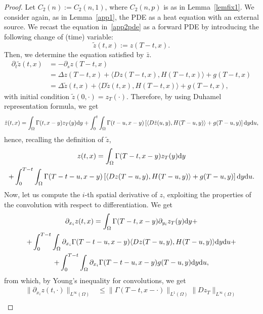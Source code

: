 \documentclass[10pt,a4paper,nouppercase,nowrite]{article}
\numberwithin{equation}{section}
\newcommand{\di}{{\rm d}}
\theoremstyle{definition}
\begin{document}
	\begin{proof}
		Let $C_2(n):=C_2(n,1)$, where $C_2(n,p)$ is as in Lemma~\ref{lemfix1}. We consider again, as in Lemma~\ref{app1}, the PDE as a heat equation with an external source. We recast the equation in~\eqref{app2pde} as a forward PDE by introducing the following change of (time) variable:
		$$\tilde z(t,x):=z(T-t,x).$$
		Then, we determine the equation satisfied by $\bar{z}$. 
		\begin{equation*}
			\begin{aligned}
				\partial_t \tilde z(t,x) &= -\partial_s z(T-t,x) \\
				&= \Delta z(T-t,x) + \langle Dz(T-t,x),H(T-t,x) \rangle + g(T-t,x) \\
				&=\Delta \tilde z (t,x) + \langle D\tilde z(t,x),H(T-t,x) \rangle + g(T-t,x),
			\end{aligned}
		\end{equation*}
		with initial condition $\tilde z(0,\cdot)=z_T(\cdot)$. Therefore, by using Duhamel representation formula, we get
		\begin{equation*}
			\tilde z(t,x)=\int_{\Omega} \Gamma(t,x-y) z_T(y) \di y + \int_0^t \int_{\Omega} \Gamma(t-u,x-y) \left[ \langle D\tilde z(u,y),H(T-u,y) \rangle + g(T-u,y) \right] \di y \di u,
		\end{equation*}
		hence, recalling the definition of $\tilde z$, 
		\begin{multline*}
			z(t,x)=\int_{\Omega} \Gamma(T-t,x-y)z_T(y) \di y \\ + \int_0^{T-t} \int_{\Omega} \Gamma(T-t-u,x-y) \left[ \langle Dz(T-u,y),H(T-u,y) \rangle + g(T-u,y) \right] \di y \di u.
		\end{multline*}
		Now, let us compute the $i$-th spatial derivative of $z$, exploiting the properties of the convolution with respect to differentiation. We get
		\begin{multline*}
			\partial_{x_i} z(t,x) = \int_{\Omega} \Gamma(T-t,x-y) \partial_{y_i} z_T(y) \di y + \\ + \int_0^{T-t} \int_{\Omega} \partial_{x_i} \Gamma(T-t-u,x-y) \langle Dz(T-u,y),H(T-u,y) \rangle \di y \di u +\\
			+\int_0^{T-t} \int_{\Omega} \partial_{x_i} \Gamma(T-t-u,x-y) g(T-u,y) \di y \di u,
		\end{multline*}
		from which, by Young's inequality for convolutions, we get
		\begin{equation*}
			\begin{split}
			\| \partial_{x_i} z(t,\cdot) \|_{L^{\infty}(\Omega)} &\le \| \Gamma(T-t,x-\cdot)\|_{L^1(\Omega)} \| Dz_T \|_{L^{\infty}(\Omega)} \\ 

\end{split}
\end{equation*}
\end{proof}
\end{document}
